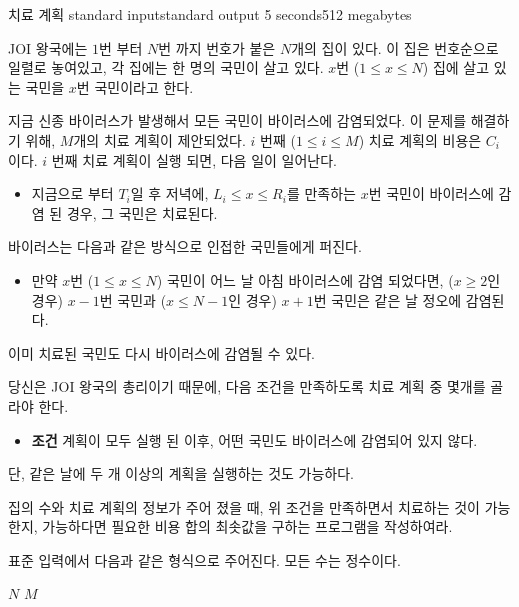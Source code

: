 \begin{problem}{치료 계획}
	{standard input}{standard output}
	{5 seconds}{512 megabytes}{}
	
	JOI 왕국에는 $1$번 부터 $N$번 까지 번호가 붙은 $N$개의 집이 있다. 이 집은 번호순으로 일렬로 놓여있고, 각 집에는 한 명의 국민이 살고 있다. $x$번 ($1 \le x \le N$) 집에 살고 있는 국민을 $x$번 국민이라고 한다.
	
	지금 신종 바이러스가 발생해서 모든 국민이 바이러스에 감염되었다. 이 문제를 해결하기 위해, $M$개의 치료 계획이 제안되었다. $i$ 번째 ($1 \le i \le M$) 치료 계획의 비용은 $C_i$이다. $i$ 번째 치료 계획이 실행 되면, 다음 일이 일어난다.
	
	\begin{itemize}
		\item[] 지금으로 부터 $T_i$일 후 저녁에, $L_i \le x \le R_i$를 만족하는 $x$번 국민이 바이러스에 감염 된 경우, 그 국민은 치료된다.
	\end{itemize}

	바이러스는 다음과 같은 방식으로 인접한 국민들에게 퍼진다.
	
	\begin{itemize}
		
		\item[] 만약 $x$번 ($1 \le x \le N$) 국민이 어느 날 아침 바이러스에 감염 되었다면, ($x \ge 2$인 경우) $x-1$번 국민과 ($x\le N-1$인 경우) $x+1$번 국민은 같은 날 정오에 감염된다.
	\end{itemize}

	이미 치료된 국민도 다시 바이러스에 감염될 수 있다.
	
	당신은 JOI 왕국의 총리이기 때문에, 다음 조건을 만족하도록 치료 계획 중 몇개를 골라야 한다.
	
	\begin{itemize}
		\item[] \textbf{조건} 계획이 모두 실행 된 이후, 어떤 국민도 바이러스에 감염되어 있지 않다.
	\end{itemize}

	단, 같은 날에 두 개 이상의 계획을 실행하는 것도 가능하다.
	
	집의 수와 치료 계획의 정보가 주어 졌을 때, 위 조건을 만족하면서 치료하는 것이 가능한지, 가능하다면 필요한 비용 합의 최솟값을 구하는 프로그램을 작성하여라.
	
	
	
	\InputFile
	
	표준 입력에서 다음과 같은 형식으로 주어진다. 모든 수는 정수이다.
	
	$N$ $M$ 
	

\end{problem}
